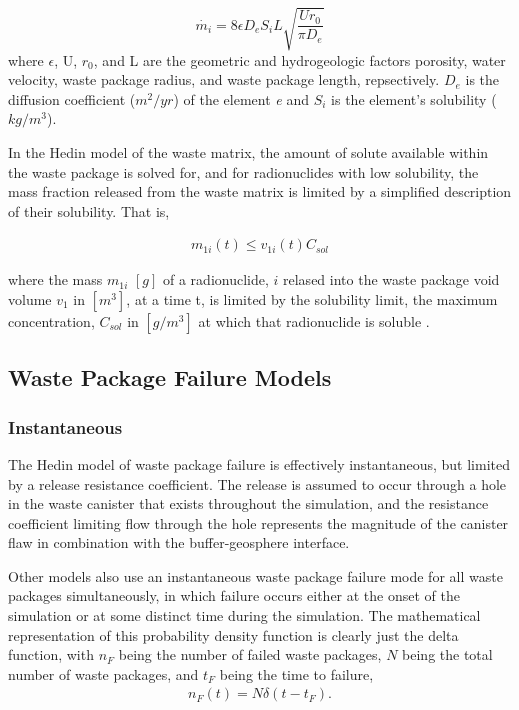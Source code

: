 \begin{equation} \dot{m_i}=8\epsilon D_eS_iL\sqrt{\frac{Ur_0}{\pi D_e}}
\end{equation} where $\epsilon$, U, $r_0$, and L are the geometric and
hydrogeologic factors porosity, water velocity, waste package radius, and waste
package length, repsectively. $D_e$ is the diffusion coefficient ($m^2/yr$) of
the element \emph{e} and $S_i$ is the element's solubility ($kg/m^3$).

In the Hedin model of the waste matrix, the amount of solute available within
the waste package is solved for, and for radionuclides with low solubility, the mass
fraction released from the waste matrix is limited by a simplified description
of their solubility. That is, 

\begin{align} 
  m_{1i}(t)\le v_{1i}(t)C_{sol}
\end{align}

where the mass $m_{1i}$ $[g]$ of a radionuclide, $i$ relased into the waste package
void volume $v_1$ in $[m^3]$, at a time t, is limited by the solubility limit, 
the maximum concentration, $C_{sol}$ in $[g/m^3]$ at which that radionuclide is 
soluble \cite{hedin_integrated_2002}.


\subsection{Waste Package Failure Models}




\subsubsection{Instantaneous}
 
The Hedin model of waste package failure is effectively instantaneous, but
limited by a release resistance coefficient. The release is assumed  to occur
through a hole in the waste canister that exists throughout the simulation, and
the resistance coefficient limiting flow through the hole represents the
magnitude of the canister flaw in combination with the buffer-geosphere
interface\cite{hedin_integrated_2002}.

Other models also use an instantaneous waste package failure mode for all waste  
packages simultaneously, in which failure occurs either at the onset of the simulation
or at some distinct time during the simulation. The mathematical representation of this 
probability density function is clearly just the delta function, with $n_F$ 
being the number of failed waste packages, $N$ being the total number of waste 
packages, and $t_F$ being the time to failure,
\begin{align}
  n_F(t) = N\delta(t-t_F).
  \label{instantaneous}
\end{align}

